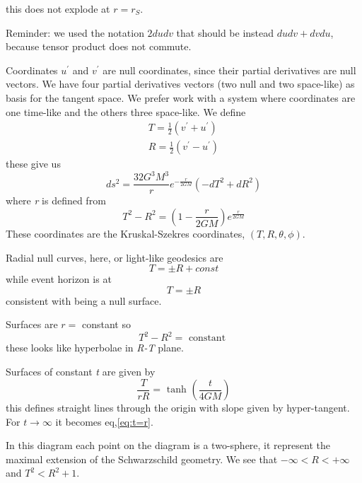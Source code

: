 this does not explode at $r = r_{S}$.\par
Reminder: we used the notation $2dudv$ that should be instead $dudv +dvdu$, because tensor product does not commute.\par
Coordinates $u^{\prime }$ and $v^{\prime }$ are null coordinates, since their partial derivatives are null vectors. We have four partial derivatives vectors (two null and two space-like) as basis for the tangent space. We prefer work with a system where coordinates are one time-like and the others three space-like. We define
\begin{gather*}
T = \frac{1}{2} \left( v^{\prime }+u^{\prime } \right) \\
R = \frac{1}{2} \left( v^{\prime }-u^{\prime } \right)
\end{gather*}
these give us
\begin{equation}
ds^{2 } = \frac{32G^{3}M^{3}}{r}e^{-\frac{r}{2GM}}\left( -dT^{2}+dR^{2} \right)
\end{equation}
where \emph{r} is defined from
\begin{equation}
T^{2}-R^{2} = \left( 1- \frac{r}{2GM} \right)e^{\frac{r}{2GM}}
\end{equation}
These coordinates are the Kruskal-Szekres coordinates, $\left( T,R,\theta,\phi  \right)$.\par
Radial null curves, here, or light-like geodesics are
\begin{equation}
T = \pm R + const
\end{equation}
while event horizon is at
\begin{equation}\label{eq:t=r}
T = \pm R
\end{equation}
consistent with being a null surface.\par
Surfaces are $r =$ constant so
\begin{equation}
T^{2} - R^{2} = \text{ constant }
\end{equation}
these looks like hyperbolae in \emph{R-T} plane.\par
Surfaces of constant \emph{t} are given by
\begin{equation}
\frac{T}{rR} = \text{ tanh }\left( \frac{t}{4GM} \right)
\end{equation}
this defines straight lines through the origin with slope given by hyper-tangent. For $t\to \infty$ it becomes eq,\ref{eq:t=r}.\par
In this diagram each point on the diagram is a two-sphere, it represent the maximal extension of the Schwarzschild geometry.
We see that $-\infty < R < +\infty$ and $T^{2}< R^{2 }+1$.
